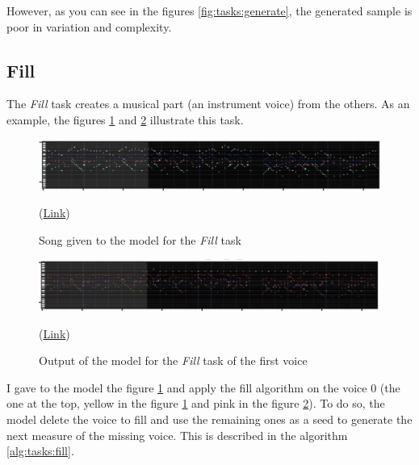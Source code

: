 \documentclass[12pt]{report}
\begin{document}
However, as you can see in the figures \ref{fig:tasks:generate}, the generated sample is poor in variation and complexity.

\subsection{Fill}
\label{sec:tasks:fill}

The \textit{Fill} task creates a musical part (an instrument voice) from the others.
As an example, the figures \ref{fig:tasks:fill:truth} and \ref{fig:tasks:fill:0} illustrate this task.

\begin{figure}[htbp]
    \centering
    \includegraphics[width=\textwidth]{images/generated_midis/tasks/fill/task-fill-truth.jpg}
    \caption{Song given to the model for the \textit{Fill} task}
    (\href{https://github.com/ValentinVignal/midiGenerator/blob/master/samples/tasks/fill_truth.mid}{Link})
    \label{fig:tasks:fill:truth}
\end{figure}

\begin{figure}[htbp]
    \centering
    \includegraphics[width=\textwidth]{images/generated_midis/tasks/fill/task-fill-0.jpg}
    \caption{Output of the model for the \textit{Fill} task of the first voice}
    (\href{https://github.com/ValentinVignal/midiGenerator/blob/master/samples/tasks/fill_1.mid}{Link})
    \label{fig:tasks:fill:0}
\end{figure}

I gave to the model the figure \ref{fig:tasks:fill:truth} and apply the fill algorithm on the voice $0$ (the one at the top, yellow in the figure \ref{fig:tasks:fill:truth} and pink in the figure \ref{fig:tasks:fill:0}).
To do so, the model delete the voice to fill and use the remaining ones as a seed to generate the next measure of the missing voice.
This is described in the algorithm \ref{alg:tasks:fill}.
\end{document}
